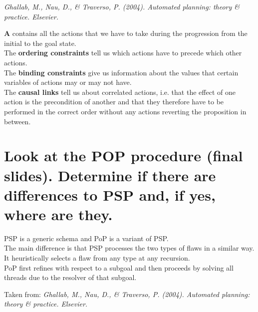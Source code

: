 \documentclass[paper=a4, fontsize=11pt]{scrartcl} %
\numberwithin{equation}{section} %
\numberwithin{figure}{section} %
\numberwithin{table}{section} %
\begin{document}
\textit{Ghallab, M., Nau, D., \& Traverso, P. (2004). Automated planning: theory \& practice. Elsevier.}\vspace{5mm}

\textbf{A} contains all the actions that we have to take during the progression from the initial to the goal state.\\
The \textbf{ordering constraints} tell us which actions have to precede which other actions.\\
The \textbf{binding constraints} give us information about the values that certain variables of actions may or may not have.\\
The \textbf{causal links} tell us about correlated actions, i.e. that the effect of one action is the precondition of another and that they therefore have to be performed in the correct order without any actions reverting the proposition in between.

\section{Look at the POP procedure (final slides). Determine if there are differences to PSP and, if yes, where are they.}

PSP is a generic schema and PoP is a variant of PSP.\\
The main difference is that PSP processes the two types of flaws in a similar way. It heuristically selects a flaw from any type at any recursion.\\
PoP first refines with respect to a subgoal and then proceeds by solving all threads due to the resolver of that subgoal.\vspace{5mm}

Taken from: \textit{Ghallab, M., Nau, D., \& Traverso, P. (2004). Automated planning: theory \& practice. Elsevier.}
\end{document}
